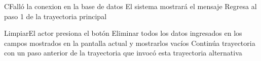 
\begin{UCtrayectoriaA}{C}{Falló la conexion en la base de datos}
			\UCpaso[\UCsist] El sistema mostrará el mensaje 
			\UCpaso[\UCsist] Regresa al paso 1 de la trayectoria principal  
\end{UCtrayectoriaA}


\begin{UCtrayectoriaA}{Limpiar}{El actor presiona el botón }
			\UCpaso[\UCsist] Eliminar todos los datos ingresados en los campos mostrados en la pantalla actual y mostrarlos vacíos
			\UCpaso[\UCsist] Continúa trayectoria con un paso anterior de la trayectoria que invocó esta trayectoria alternativa
\end{UCtrayectoriaA}